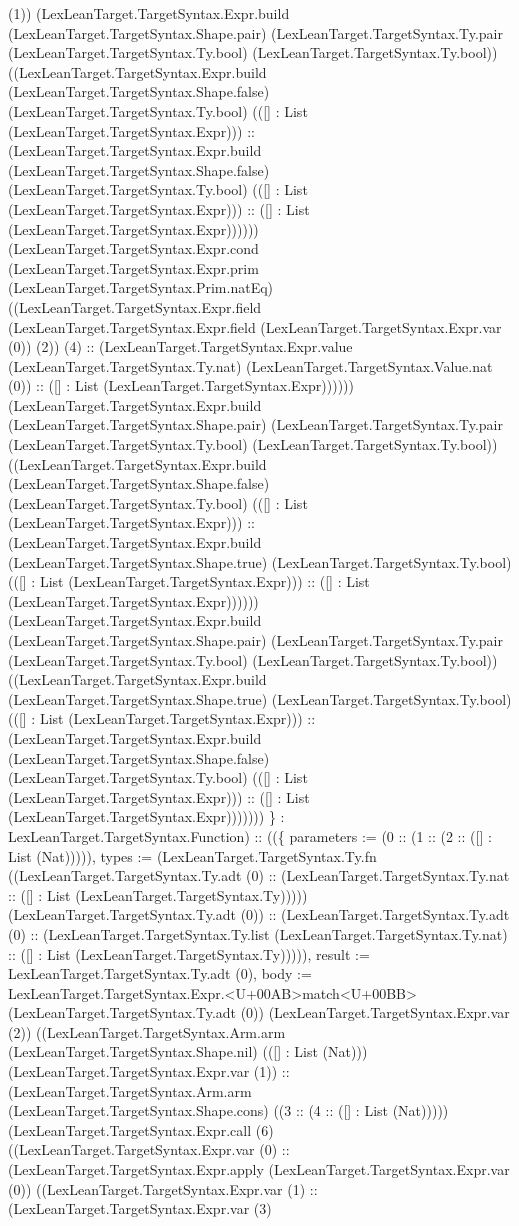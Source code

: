 \documentclass[11pt]{article}
\begin{document}
(1)) (LexLeanTarget.TargetSyntax.Expr.build (LexLeanTarget.TargetSyntax.Shape.pair) (LexLeanTarget.TargetSyntax.Ty.pair (LexLeanTarget.TargetSyntax.Ty.bool) (LexLeanTarget.TargetSyntax.Ty.bool)) ((LexLeanTarget.TargetSyntax.Expr.build (LexLeanTarget.TargetSyntax.Shape.false) (LexLeanTarget.TargetSyntax.Ty.bool) (([] : List (LexLeanTarget.TargetSyntax.Expr))) :: (LexLeanTarget.TargetSyntax.Expr.build (LexLeanTarget.TargetSyntax.Shape.false) (LexLeanTarget.TargetSyntax.Ty.bool) (([] : List (LexLeanTarget.TargetSyntax.Expr))) :: ([] : List (LexLeanTarget.TargetSyntax.Expr)))))) (LexLeanTarget.TargetSyntax.Expr.cond (LexLeanTarget.TargetSyntax.Expr.prim (LexLeanTarget.TargetSyntax.Prim.natEq) ((LexLeanTarget.TargetSyntax.Expr.field (LexLeanTarget.TargetSyntax.Expr.field (LexLeanTarget.TargetSyntax.Expr.var (0)) (2)) (4) :: (LexLeanTarget.TargetSyntax.Expr.value (LexLeanTarget.TargetSyntax.Ty.nat) (LexLeanTarget.TargetSyntax.Value.nat (0)) :: ([] : List (LexLeanTarget.TargetSyntax.Expr)))))) (LexLeanTarget.TargetSyntax.Expr.build (LexLeanTarget.TargetSyntax.Shape.pair) (LexLeanTarget.TargetSyntax.Ty.pair (LexLeanTarget.TargetSyntax.Ty.bool) (LexLeanTarget.TargetSyntax.Ty.bool)) ((LexLeanTarget.TargetSyntax.Expr.build (LexLeanTarget.TargetSyntax.Shape.false) (LexLeanTarget.TargetSyntax.Ty.bool) (([] : List (LexLeanTarget.TargetSyntax.Expr))) :: (LexLeanTarget.TargetSyntax.Expr.build (LexLeanTarget.TargetSyntax.Shape.true) (LexLeanTarget.TargetSyntax.Ty.bool) (([] : List (LexLeanTarget.TargetSyntax.Expr))) :: ([] : List (LexLeanTarget.TargetSyntax.Expr)))))) (LexLeanTarget.TargetSyntax.Expr.build (LexLeanTarget.TargetSyntax.Shape.pair) (LexLeanTarget.TargetSyntax.Ty.pair (LexLeanTarget.TargetSyntax.Ty.bool) (LexLeanTarget.TargetSyntax.Ty.bool)) ((LexLeanTarget.TargetSyntax.Expr.build (LexLeanTarget.TargetSyntax.Shape.true) (LexLeanTarget.TargetSyntax.Ty.bool) (([] : List (LexLeanTarget.TargetSyntax.Expr))) :: (LexLeanTarget.TargetSyntax.Expr.build (LexLeanTarget.TargetSyntax.Shape.false) (LexLeanTarget.TargetSyntax.Ty.bool) (([] : List (LexLeanTarget.TargetSyntax.Expr))) :: ([] : List (LexLeanTarget.TargetSyntax.Expr))))))) \} : LexLeanTarget.TargetSyntax.Function) :: ((\{ parameters := (0 :: (1 :: (2 :: ([] : List (Nat))))), types := (LexLeanTarget.TargetSyntax.Ty.fn ((LexLeanTarget.TargetSyntax.Ty.adt (0) :: (LexLeanTarget.TargetSyntax.Ty.nat :: ([] : List (LexLeanTarget.TargetSyntax.Ty))))) (LexLeanTarget.TargetSyntax.Ty.adt (0)) :: (LexLeanTarget.TargetSyntax.Ty.adt (0) :: (LexLeanTarget.TargetSyntax.Ty.list (LexLeanTarget.TargetSyntax.Ty.nat) :: ([] : List (LexLeanTarget.TargetSyntax.Ty))))), result := LexLeanTarget.TargetSyntax.Ty.adt (0), body := LexLeanTarget.TargetSyntax.Expr.<U+00AB>match<U+00BB> (LexLeanTarget.TargetSyntax.Ty.adt (0)) (LexLeanTarget.TargetSyntax.Expr.var (2)) ((LexLeanTarget.TargetSyntax.Arm.arm (LexLeanTarget.TargetSyntax.Shape.nil) (([] : List (Nat))) (LexLeanTarget.TargetSyntax.Expr.var (1)) :: (LexLeanTarget.TargetSyntax.Arm.arm (LexLeanTarget.TargetSyntax.Shape.cons) ((3 :: (4 :: ([] : List (Nat))))) (LexLeanTarget.TargetSyntax.Expr.call (6) ((LexLeanTarget.TargetSyntax.Expr.var (0) :: (LexLeanTarget.TargetSyntax.Expr.apply (LexLeanTarget.TargetSyntax.Expr.var (0)) ((LexLeanTarget.TargetSyntax.Expr.var (1) :: (LexLeanTarget.TargetSyntax.Expr.var (3) 
\end{document}
